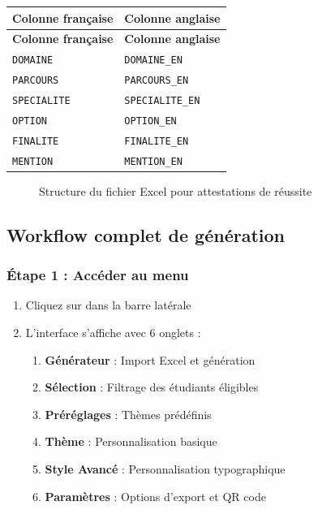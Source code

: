\begin{longtable}{|l|l|}
\hline
\textbf{Colonne française} & \textbf{Colonne anglaise} \\
\hline
\endfirsthead
\hline
\textbf{Colonne française} & \textbf{Colonne anglaise} \\
\hline
\endhead
\hline
\endfoot

\texttt{DOMAINE} & \texttt{DOMAINE\_EN} \\
\hline
\texttt{PARCOURS} & \texttt{PARCOURS\_EN} \\
\hline
\texttt{SPECIALITE} & \texttt{SPECIALITE\_EN} \\
\hline
\texttt{OPTION} & \texttt{OPTION\_EN} \\
\hline
\texttt{FINALITE} & \texttt{FINALITE\_EN} \\
\hline
\texttt{MENTION} & \texttt{MENTION\_EN} \\
\hline
\end{longtable}

\begin{figure}[h]
    \centering
    \caption{Structure du fichier Excel pour attestations de réussite}
\end{figure}

\subsection{Workflow complet de génération}

\subsubsection{Étape 1 : Accéder au menu}

\begin{enumerate}[leftmargin=*]
    \item Cliquez sur  dans la barre latérale
    \item L'interface s'affiche avec 6 onglets :
    \begin{enumerate}
        \item \textbf{Générateur} : Import Excel et génération
        \item \textbf{Sélection} : Filtrage des étudiants éligibles
        \item \textbf{Préréglages} : Thèmes prédéfinis
        \item \textbf{Thème} : Personnalisation basique
        \item \textbf{Style Avancé} : Personnalisation typographique
        \item \textbf{Paramètres} : Options d'export et QR code
    \end{enumerate}
\end{enumerate}

